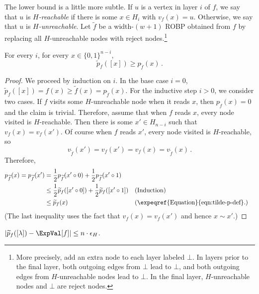The lower bound is a little more subtle. If $u$ is a vertex in layer $i$ of $f$, we say that $u$ is \emph{$H$-reachable} if there is some $x \in H_i$ with $v_f(x) = u$. Otherwise, we say that $u$ is \emph{$H$-unreachable}. Let $\widetilde{f}$ be a width-$(w + 1)$ ROBP obtained from $f$ by replacing all $H$-unreachable nodes with reject nodes.\footnote{More precisely, add an extra node to each layer labeled $\bot$. In layers prior to the final layer, both outgoing edges from $\bot$ lead to $\bot$, and both outgoing edges from $H$-unreachable nodes lead to $\bot$. In the final layer, $H$-unreachable nodes and $\bot$ are reject nodes.}

\begin{claim} \label{clm:const-width-lb}
For every $i$, for every $x \in \{0, 1\}^{n - i}$,
$$
\widetilde{p}_f([x]) \geq p_{\widetilde{f}}(x)\,.
$$
\end{claim}

\begin{proof}
We proceed by induction on $i$. In the base case $i = 0$, $\widetilde{p}_f([x]) = f(x) \geq \widetilde{f}(x) = p_{\widetilde{f}}(x)$. For the inductive step $i > 0$, we consider two cases. If $f$ visits some $H$-unreachable node when it reads $x$, then $p_{\widetilde{f}}(x) = 0$ and the claim is trivial. Therefore, assume that when $f$ reads $x$, every node visited is $H$-reachable. Then there is some $x' \in H_{n - i}$ such that $v_f(x) = v_f(x')$. Of course when $f$ reads $x'$, every node visited is $H$-reachable, so
$$
v_{\widetilde{f}}(x') = v_f(x') = v_f(x) = v_{\widetilde{f}}(x)\,.
$$
Therefore,
\begin{align*}
p_{\widetilde{f}}(x) = p_{\widetilde{f}}(x') &= \frac{1}{2} p_{\widetilde{f}}(x' \circ 0) + \frac{1}{2} p_{\widetilde{f}}(x' \circ 1) \\
&\leq \frac{1}{2} \widetilde{p}_f([x' \circ 0]) + \frac{1}{2} \widetilde{p}_f([x' \circ 1]) && \text{(Induction)} \\
&\leq \widetilde{p}_f(x) && (\text{\expeqref{Equation}{eqn:tilde-p-def}.})
\end{align*}
(The last inequality uses the fact that $v_f(x) = v_f(x')$ and hence $x \sim x'$.)
\end{proof}

\begin{corollary} \label{cor:tilde-p-error}
$|\widetilde{p}_f([\lambda]) - \ExpVal[f]| \leq n \cdot \epsilon_H$.
\end{corollary}

